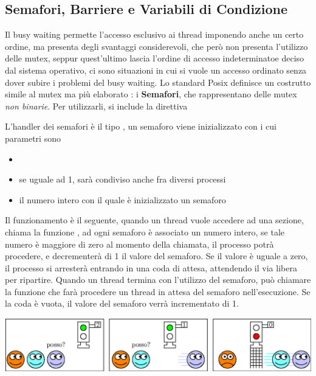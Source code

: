 \documentclass[10pt, letterpaper]{report}
\begin{document}
\subsection{Semafori, Barriere e Variabili di Condizione}
Il busy waiting permette l'accesso esclusivo ai thread imponendo anche un certo ordine, ma presenta 
degli svantaggi considerevoli, che però non presenta l'utilizzo delle mutex, seppur quest'ultimo 
lascia l'ordine di accesso indeterminatoe deciso dal sistema operativo, ci sono situazioni in cui 
si vuole un accesso ordinato senza dover subire i problemi del busy waiting.\acc 
Lo standard Posix definisce un costrutto simile al mutex ma più elaborato : i \textbf{Semafori}, che rappresentano 
delle mutex \textit{non binarie}. Per utilizzarli, si include la direttiva\begin{quotation}
\end{quotation}
L'handler dei semafori è il tipo , un semaforo viene inizializzato con  i cui 
parametri sono\begin{itemize}
    \item {}
    \item {} se uguale ad 1, sarà condiviso anche fra diversi processi 
    \item {} il numero intero con il quale è inizializzato un semaforo
\end{itemize}
Il funzionamento è il seguente, quando un thread vuole accedere ad una sezione, chiama la funzione 
, ad ogni semaforo è associato un numero intero, se tale numero è maggiore 
di zero al momento della chiamata, il processo potrà procedere, e decrementerà di 1 il valore del semaforo. \acc 
Se il valore è uguale a zero, il processo si arresterà entrando in una 
coda di attesa, attendendo il via libera per ripartire.\acc 
Quando un thread termina con l'utilizzo del semaforo, può chiamare la funzione  che 
farà procedere un thread in attesa del semaforo nell'esecuzione. Se la coda è vuota, il valore del semaforo verrà incrementato 
di 1.\begin{center}
    \includegraphics[width=1\textwidth]{images/sem.eps}
\end{center}
\end{document}
